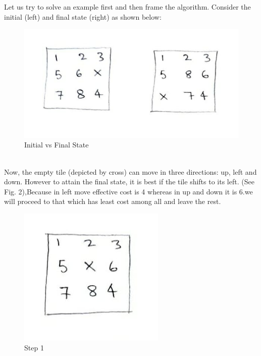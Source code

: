Let us try to solve an example first and then frame the algorithm. Consider the initial (left) and final state (right) as shown below:\\
\begin{figure}[htbp]
    \centering
    \includegraphics[scale = 0.45]{InitialvsFinal.jpeg}
    \caption{Initial vs Final State}
\end{figure}\\


Now, the empty tile (depicted by cross) can move in three directions: up, left and down. However to attain the final state, it is best if the tile shifts to its left. (See Fig. 2),Because in left move effective cost is 4 whereas in up and down it is 6.we will proceed to that which has least cost among all and leave the rest. \\
\begin{figure}[htbp]
    \centering
    \includegraphics[scale = 0.50]{step1.jpeg}
    \caption{Step 1}
\end{figure}\\


